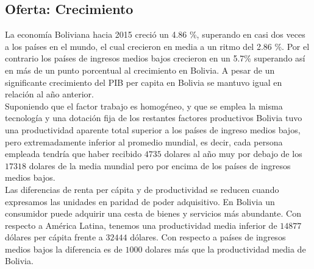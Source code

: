     \subsection{Oferta: Crecimiento}
    La economía Boliviana hacia 2015 creció un 4.86 \%, superando en casi dos veces a los países en el mundo, el cual crecieron en media a un ritmo del 2.86 \%. Por el contrario los países de ingresos medios bajos crecieron en un 5.7\% superando así en más de un punto porcentual al crecimiento en Bolivia. A pesar de un significante crecimiento del PIB per capita en Bolivia se mantuvo igual en relación al año anterior.\\
    Suponiendo que el factor trabajo es homogéneo, y que se emplea la misma tecnología y una dotación fija de los restantes factores productivos Bolivia tuvo una productividad aparente total superior a los países de ingreso medios bajos, pero extremadamente inferior al promedio mundial, es decir, cada persona empleada tendría que haber recibido $4735$ dolares al año muy por debajo de los $17318$ dolares de la media mundial pero por encima de los países de ingresos medios bajos.\\
    Las diferencias de renta per cápita y de productividad se reducen cuando expresamos las unidades en paridad de poder adquisitivo. En Bolivia un consumidor puede adquirir una cesta de bienes y servicios más abundante. Con respecto a América Latina, tenemos una productividad media inferior de $14877$ dólares per cápita frente a $32444$ dólares. Con respecto a países de ingresos medios bajos la diferencia es de $1000$ dolares más que la productividad media de Bolivia.


